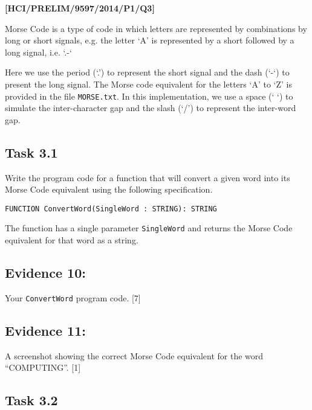 \item \textbf{{[}HCI/PRELIM/9597/2014/P1/Q3{]} }

Morse Code is a type of code in which letters are represented by combinations
by long or short signals, e.g. the letter \textquoteleft A\textquoteright{}
is represented by a short followed by a long signal, i.e. \textquoteleft .-\textquoteleft{} 

Here we use the period (\textquoteleft .\textquoteright ) to represent
the short signal and the dash (\textquoteleft -\textquoteleft ) to
present the long signal. The Morse code equivalent for the letters
\textquoteleft A\textquoteright{} to \textquoteleft Z\textquoteright{}
is provided in the file \texttt{MORSE.txt}. In this implementation,
we use a space (\textquoteleft{} \textquoteleft ) to simulate the
inter-character gap and the slash (\textquoteleft /\textquoteright )
to represent the inter-word gap. 

\subsection*{Task 3.1 }

Write the program code for a function that will convert a given word
into its Morse Code equivalent using the following specification. 
\noindent \begin{center}
\texttt{FUNCTION ConvertWord(SingleWord : STRING): STRING }
\par\end{center}

The function has a single parameter \texttt{SingleWord} and returns
the Morse Code equivalent for that word as a string. 

\subsection*{Evidence 10: }

Your \texttt{ConvertWord} program code. \hfill{} {[}7{]}

\subsection*{Evidence 11: }

A screenshot showing the correct Morse Code equivalent for the word
\textquotedblleft COMPUTING\textquotedblright . \hfill{} {[}1{]}

\subsection*{Task 3.2 }

